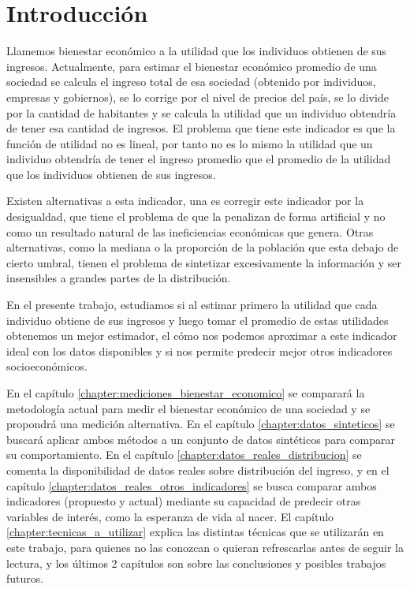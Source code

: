 \chapter{Introducción}

Llamemos bienestar económico a la utilidad que los individuos obtienen de sus ingresos. Actualmente, para estimar el bienestar económico promedio de una sociedad se calcula el ingreso total de esa sociedad (obtenido por individuos, empresas y gobiernos), se lo corrige por el nivel de precios del país, se lo divide por la cantidad de habitantes y se calcula la utilidad que un individuo obtendría de tener esa cantidad de ingresos. El problema que tiene este indicador es que la función de utilidad no es lineal, por tanto no es lo mismo la utilidad que un individuo obtendría de tener el ingreso promedio que el promedio de la utilidad que los individuos obtienen de sus ingresos. 

Existen alternativas a esta indicador, una es corregir este indicador por la desigualdad, que tiene el problema de que la penalizan de forma artificial y no como un resultado natural de las ineficiencias económicas que genera. Otras alternativas, como la mediana o la proporción de la población que esta debajo de cierto umbral, tienen el problema de sintetizar excesivamente la información y ser insensibles a grandes partes de la distribución.

En el presente trabajo, estudiamos si al estimar primero la utilidad que cada individuo obtiene de sus ingresos y luego tomar el promedio de estas utilidades obtenemos un mejor estimador, el cómo nos podemos aproximar a este indicador ideal con los datos disponibles y si nos permite predecir mejor otros indicadores socioeconómicos.

En el capítulo \ref{chapter:mediciones_bienestar_economico} se comparará la metodología actual para medir el bienestar económico de una sociedad y se propondrá una medición alternativa. En el capítulo \ref{chapter:datos_sinteticos} se buscará aplicar ambos métodos a un conjunto de datos sintéticos para comparar su comportamiento. En el capítulo \ref{chapter:datos_reales_distribucion} se comenta la disponibilidad de datos reales sobre distribución del ingreso, y en el capítulo \ref{chapter:datos_reales_otros_indicadores} se busca comparar ambos indicadores (propuesto y actual) mediante su capacidad de predecir otras variables de interés, como la esperanza de vida al nacer. El capítulo \ref{chapter:tecnicas_a_utilizar} explica las distintas técnicas que se utilizarán en este trabajo, para quienes no las conozcan o quieran refrescarlas antes de seguir la lectura, y los últimos 2 capítulos son sobre las conclusiones y posibles trabajos futuros.

